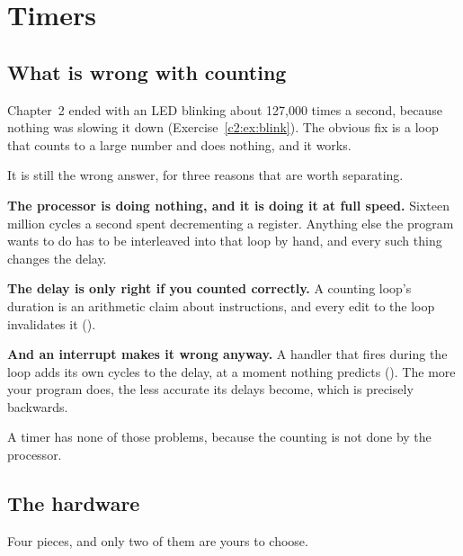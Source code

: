 
\section{Timers}
\label{c5:sec:timers}

\subsection{What is wrong with counting}
\label{c5:sec:counting}
Chapter~2 ended with an LED blinking about 127,000 times a second, because nothing was slowing it
down (Exercise~\ref{c2:ex:blink}). The obvious fix is a loop that counts to a large number and does
nothing, and it works.

It is still the wrong answer, for three reasons that are worth separating.

\textbf{The processor is doing nothing, and it is doing it at full speed.} Sixteen million cycles a
second spent decrementing a register. Anything else the program wants to do has to be interleaved
into that loop by hand, and every such thing changes the delay.

\textbf{The delay is only right if you counted correctly.} A counting loop's duration is an
arithmetic claim about instructions, and every edit to the loop invalidates it
().

\textbf{And an interrupt makes it wrong anyway.} A handler that fires during the loop adds its own
cycles to the delay, at a moment nothing predicts (). The more your program
does, the less accurate its delays become, which is precisely backwards.

A timer has none of those problems, because the counting is not done by the processor.

\subsection{The hardware}
\label{c5:sec:hardware}


Four pieces, and only two of them are yours to choose.

